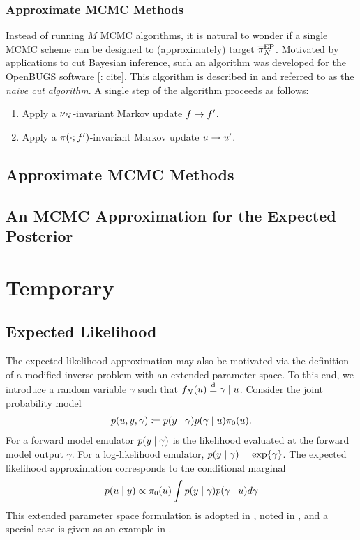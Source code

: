 \documentclass[12pt]{article}
\begin{document}
\subsubsection{Approximate MCMC Methods}
Instead of running $M$ MCMC algorithms, it is natural to wonder if a single MCMC scheme can be designed
to (approximately) target $\postApproxEP$. Motivated by applications to cut Bayesian inference, 
such an algorithm was developed for the OpenBUGS software [\todo: cite]. This algorithm is described in 
\citep{PlummerCut} and referred to as the \textit{naive cut algorithm}. A single step of the algorithm proceeds
as follows:
\begin{enumerate}
\item Apply a $\emDist$-invariant Markov update $\targetTraj \to \targetTraj^\prime$.
\item Apply a $\postDens(\cdot; \targetTraj^\prime)$-invariant Markov update $\Par \to \Par^\prime$.
\end{enumerate}

\subsection{Approximate MCMC Methods}
\subsection{An MCMC Approximation for the Expected Posterior} \label{sec:mcmc-ep}


\section{Temporary}
\subsection{Expected Likelihood}
The expected likelihood approximation may also be motivated via the definition of a modified 
inverse problem with an extended parameter space. To this end, we introduce a random variable
$\gamma$ such that $\targetEm[\Ndesign](\Par) \overset{\mathrm{d}}{=} \gamma \given \Par$.
Consider the joint probability model 
\begin{align}
p(\Par, \obs, \gamma) \Def 
p(\obs \given \gamma) p(\gamma \given \Par) \priorDens(\Par). \label{eq:EL-prob-model}
\end{align}
For a forward model emulator $p(\obs \given \gamma)$ is the likelihood evaluated at
the forward model output $\gamma$. For a log-likelihood emulator, 
$p(\obs \given \gamma) = \Exp{\gamma}$. The expected likelihood approximation 
corresponds to the conditional marginal 
\begin{align}
p(\Par \given \obs) \propto \priorDens(\Par) \int p(\obs \given \gamma) p(\gamma \given \Par) d\gamma
\label{eq:EL-marginal}
\end{align}
This extended parameter space formulation is adopted in \citet{BilionisBayesSurrogates}, noted in
\citet{SinsbeckNowak}, and a special case is given as an example in \citet{StuartTeck2}.
\end{document}
